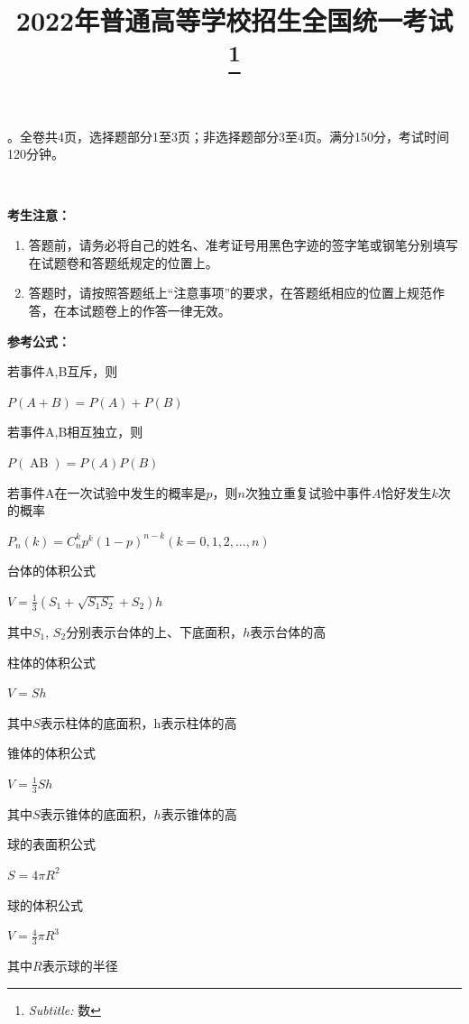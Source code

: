 \documentclass[UTF8]{ctexart}
\newcommand{\tmop}[1]{\ensuremath{\operatorname{#1}}}
\newcommand{\tmstrong}[1]{\textbf{#1}}
\newcommand{\tmsubtitle}[1]{\thanks{\textit{Subtitle:} #1}}
\begin{document}
\title{
  2022年普通高等学校招生全国统一考试
  \tmsubtitle{数}
}

\maketitle

。全卷共4页，选择题部分1至3页；非选择题部分3至4页。满分150分，考试时间120分钟。

\

{\tmstrong{考生注意：}}
\begin{enumerate}
  \item
  答题前，请务必将自己的姓名、准考证号用黑色字迹的签字笔或钢笔分别填写在试题卷和答题纸规定的位置上。
  
  \item
  答题时，请按照答题纸上``注意事项''的要求，在答题纸相应的位置上规范作答，在本试题卷上的作答一律无效。
\end{enumerate}


\begin{multicols}{2}
  {\tmstrong{参考公式：}}
  
  若事件A,B互斥，则
  
  $P (A + B) = P (A) + P (B)$
  
  若事件A,B相互独立，则
  
  $P (\tmop{AB}) = P (A) P (B)$
  
  若事件A在一次试验中发生的概率是$p$，则$n$次独立重复试验中事件$A$恰好发生$k$次的概率
  
  $P_n (k) = C^k_n p^k (1 - p)^{n - k} (k = 0, 1, 2, \ldots, n)$
  
  台体的体积公式
  
  $V = \frac{1}{3} \left( S_1 + \sqrt{S_1 S_2} + S_2 \right) h$
  
  其中$S_1$,
  $S_2$分别表示台体的上、下底面积，$h$表示台体的高
  
  柱体的体积公式
  
  $V = Sh$
  
  其中$S$表示柱体的底面积，h表示柱体的高
  
  锥体的体积公式
  
  $V = \frac{1}{3} Sh$
  
  其中$S$表示锥体的底面积，$h$表示锥体的高
  
  球的表面积公式
  
  $S = 4 \pi R^2$
  
  球的体积公式
  
  $V = \frac{4}{3} \pi R^3$
  
  其中$R$表示球的半径
\end{multicols}
\end{document}
